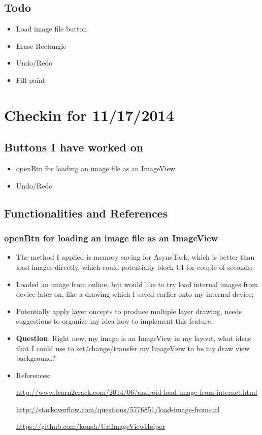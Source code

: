 \documentclass[9pt,b5paper]{article}
\begin{document}
\subsection{Todo}
\label{sec-3-5}
\begin{itemize}
\item Load image file button
\item Erase Rectangle
\item Undo/Redo
\item Fill paint
\end{itemize}

\section{Checkin for 11/17/2014}
\label{sec-4}
\subsection{Buttons I have worked on}
\label{sec-4-1}
\begin{itemize}
\item openBtn for loading an image file as an ImageView
\item Undo/Redo
\end{itemize}
\subsection{Functionalities and References}
\label{sec-4-2}
\subsubsection{openBtn for loading an image file as an ImageView}
\label{sec-4-2-1}
\begin{itemize}
\item The method I applied is memory saving for AsyncTask, which is better than load images directly, which could potentially block UI for couple of seconds;
\item Loaded an image from online, but would like to try load internal images from device later on, like a drawing which I saved earlier onto my internal device;
\item Potentially apply layer oncepts to produce multiple layer drawing, needs suggestions to organize my idea how to implement this feature.
\item \textbf{Question}: Right now, my image is an ImageView in my layout, what ideas that I could use to set/change/transfer my ImageView to be my draw view background?
\item References:

\url{http://www.learn2crack.com/2014/06/android-load-image-from-internet.html}

\url{http://stackoverflow.com/questions/5776851/load-image-from-url}

\url{https://github.com/koush/UrlImageViewHelper}
\end{itemize}
\end{document}
